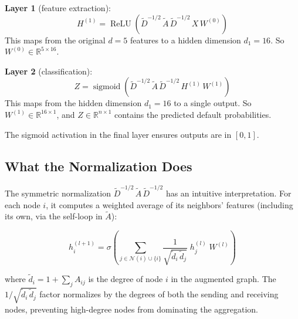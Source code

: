 \documentclass[11pt, a4paper]{article}
\theoremstyle{definition}
\theoremstyle{plain}
\theoremstyle{remark}
\newcommand{\RV}{\mathbb{R}}
\newcommand{\sigmoid}{\operatorname{sigmoid}}
\newcommand{\ReLU}{\operatorname{ReLU}}
\begin{document}
\textbf{Layer 1} (feature extraction):
\begin{equation}\label{eq:gcn-layer1}
    H^{(1)} = \ReLU\!\left(\tilde{D}^{-1/2}\, \tilde{A}\, \tilde{D}^{-1/2}\, X\, W^{(0)}\right)
\end{equation}
This maps from the original $d = 5$ features to a hidden dimension $d_1 = 16$.
So $W^{(0)} \in \RV^{5 \times 16}$.

\textbf{Layer 2} (classification):
\begin{equation}\label{eq:gcn-layer2}
    Z = \sigmoid\!\left(\tilde{D}^{-1/2}\, \tilde{A}\, \tilde{D}^{-1/2}\, H^{(1)}\, W^{(1)}\right)
\end{equation}
This maps from the hidden dimension $d_1 = 16$ to a single output.
So $W^{(1)} \in \RV^{16 \times 1}$, and $Z \in \RV^{n \times 1}$ contains the
predicted default probabilities.

The sigmoid activation in the final layer ensures outputs are in $[0, 1]$.

\subsection{What the Normalization Does}

The symmetric normalization $\tilde{D}^{-1/2}\, \tilde{A}\, \tilde{D}^{-1/2}$
has an intuitive interpretation.
For each node $i$, it computes a weighted average of its neighbors' features
(including its own, via the self-loop in $\tilde{A}$):

\begin{equation}\label{eq:gcn-nodeview}
    h_i^{(l+1)} = \sigma\!\left(\sum_{j \in \mathcal{N}(i) \cup \{i\}}
    \frac{1}{\sqrt{\tilde{d}_i\, \tilde{d}_j}}\; h_j^{(l)}\; W^{(l)}\right)
\end{equation}

where $\tilde{d}_i = 1 + \sum_j A_{ij}$ is the degree of node $i$ in the
augmented graph.
The $1/\sqrt{\tilde{d}_i\, \tilde{d}_j}$ factor normalizes by the degrees of both
the sending and receiving nodes, preventing high-degree nodes from dominating
the aggregation.
\end{document}
